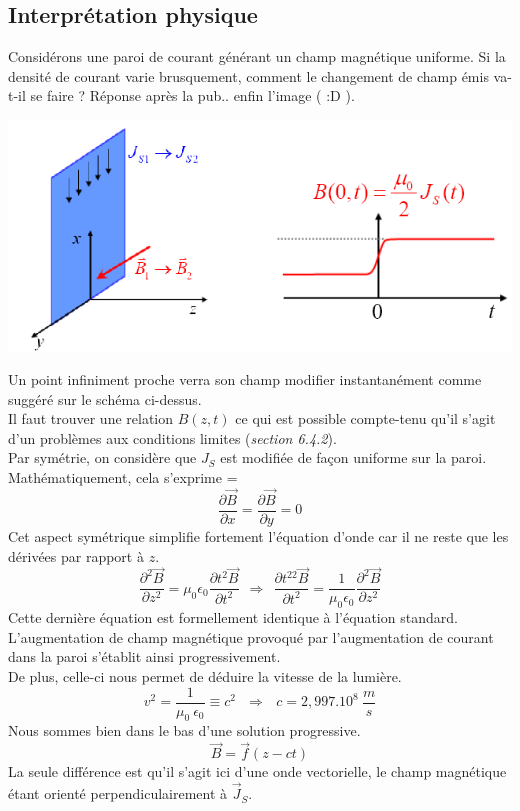 \documentclass	[11pt, a4paper, openany]{book}
\begin{document}
		\subsection{Interprétation physique}
		Considérons une paroi de courant générant un champ magnétique uniforme. Si la densité de courant varie brusquement, comment le changement de champ émis va-t-il se faire ? Réponse après la pub.. enfin l'image ( :D ).
		\begin{center}
			\includegraphics[scale=0.4]{oo/image32.png}
		\end{center}
		Un point infiniment proche verra son champ modifier instantanément comme suggéré sur le schéma ci-dessus.\\
		Il faut trouver une relation $B(z,t)$ ce qui est possible compte-tenu qu'il s'agit d'un problèmes aux conditions limites (\textit{section 6.4.2}).\\
		
		Par symétrie, on considère que $J_S$ est modifiée de façon uniforme sur la paroi. Mathématiquement, cela s'exprime =
		\begin{equation}
			\frac{\partial\vec{B}}{\partial x} = \frac{\partial \vec{B}}{\partial y} = 0
		\end{equation}
		Cet aspect symétrique simplifie fortement l'équation d'onde car il ne reste que les dérivées par rapport à $z$.
		\begin{equation}
			\frac{\partial^2\vec{B}}{\partial z^2} = \mu_0\epsilon_0\frac{\partial t^2\vec{B}}{\partial t^2}\ \ \Rightarrow\ \ \frac{\partial t^22\vec{B}}{\partial t^2}  = \frac{1}{\mu_0\epsilon_0}\frac{\partial^2\vec{B}}{\partial z^2}
		\end{equation}
		Cette dernière équation est formellement identique à l'équation standard. L'augmentation de champ magnétique provoqué par l'augmentation de courant dans la paroi s'établit ainsi progressivement.\\
		De plus, celle-ci nous permet de déduire la vitesse de la lumière.
		\begin{equation}
			v^2 = \frac{1}{\mu_0\ \epsilon_0} \equiv c^2\ \ \ \Rightarrow\ \ \ c = 2,997.10^8\ \frac{m}{s}
		\end{equation}
		Nous sommes bien dans le bas d'une solution progressive.
		\begin{equation}
			\vec{B} = \vec{f}(z - ct)
		\end{equation}
		La seule différence est qu'il s'agit ici d'une onde vectorielle, le champ magnétique étant orienté perpendiculairement à $\vec{J}_S$.\\
		
\end{document}
